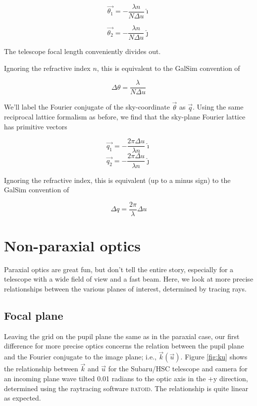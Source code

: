 \documentclass{article}
\begin{document}
\begin{equation}
    \vec{\theta_1} = -\frac{\lambda n}{N \Delta u} \hat{\imath}
\end{equation}

\begin{equation}
    \vec{\theta_2} = -\frac{\lambda n}{N \Delta u} \hat{\jmath}
\end{equation}

The telescope focal length conveniently divides out.

Ignoring the refractive index $n$, this is equivalent to the GalSim convention of

\begin{equation}
    \Delta \theta = \frac{\lambda}{N \Delta u}
\end{equation}

We'll label the Fourier conjugate of the sky-coordinate $\vec{\theta}$ as $\vec{q}$.  Using the same
reciprocal lattice formalism as before, we find that the sky-plane Fourier lattice has primitive
vectors

\begin{equation}
    \vec{q_1} = -\frac{2 \pi \Delta u}{\lambda n} \hat{\imath}
\end{equation}
\begin{equation}
    \vec{q_2} = -\frac{2 \pi \Delta u}{\lambda n} \hat{\jmath}
\end{equation}

Ignoring the refractive index, this is equivalent (up to a minus sign) to the GalSim convention of

\begin{equation}
    \Delta q = \frac{2 \pi}{\lambda} \Delta u
\end{equation}

\section{Non-paraxial optics}

Paraxial optics are great fun, but don't tell the entire story, especially for a telescope with a
wide field of view and a fast beam.  Here, we look at more precise relationships between the various
planes of interest, determined by tracing rays.

\subsection{Focal plane}

Leaving the grid on the pupil plane the same as in the paraxial case, our first difference for more
precise optics concerns the relation between the pupil plane and the Fourier conjugate to the image
plane; i.e., $\vec{k}(\vec{u})$.  Figure \ref{fig:ku} shows the relationship between $\vec{k}$ and
$\vec{u}$ for the Subaru/HSC telescope and camera for an incoming plane wave tilted 0.01 radians to
the optic axis in the +y direction, determined using the raytracing software \textsc{batoid}.  The
relationship is quite linear as expected.
\end{document}

